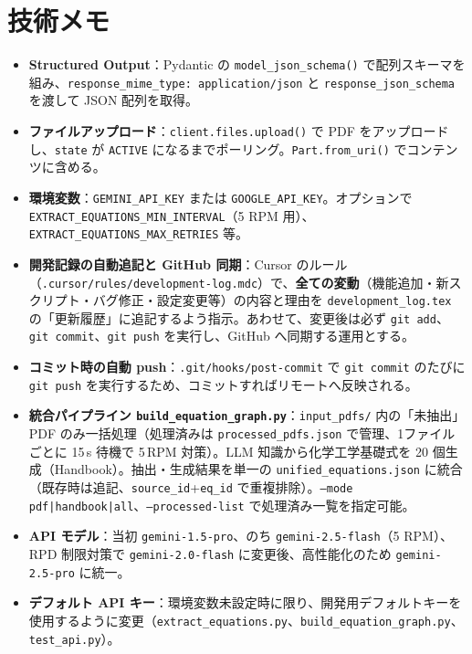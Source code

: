 \documentclass[11pt,a4paper]{jsarticle}
\begin{document}
\section{技術メモ}
\begin{itemize}[nosep]
  \item \textbf{Structured Output}：Pydantic の \texttt{model\_json\_schema()} で配列スキーマを組み、\texttt{response\_mime\_type: application/json} と \texttt{response\_json\_schema} を渡して JSON 配列を取得。
  \item \textbf{ファイルアップロード}：\texttt{client.files.upload()} で PDF をアップロードし、\texttt{state} が \texttt{ACTIVE} になるまでポーリング。\texttt{Part.from\_uri()} でコンテンツに含める。
  \item \textbf{環境変数}：\texttt{GEMINI\_API\_KEY} または \texttt{GOOGLE\_API\_KEY}。オプションで \texttt{EXTRACT\_EQUATIONS\_MIN\_INTERVAL}（5 RPM 用）、\texttt{EXTRACT\_EQUATIONS\_MAX\_RETRIES} 等。
  \item \textbf{開発記録の自動追記と GitHub 同期}：Cursor のルール（\texttt{.cursor/rules/development-log.mdc}）で、\textbf{全ての変動}（機能追加・新スクリプト・バグ修正・設定変更等）の内容と理由を \texttt{development\_log.tex} の「更新履歴」に追記するよう指示。あわせて、変更後は必ず \texttt{git add}、\texttt{git commit}、\texttt{git push} を実行し、GitHub へ同期する運用とする。
  \item \textbf{コミット時の自動 push}：\texttt{.git/hooks/post-commit} で \texttt{git commit} のたびに \texttt{git push} を実行するため、コミットすればリモートへ反映される。
  \item \textbf{統合パイプライン \texttt{build\_equation\_graph.py}}：\texttt{input\_pdfs/} 内の「未抽出」PDF のみ一括処理（処理済みは \texttt{processed\_pdfs.json} で管理、1ファイルごとに 15\,s 待機で 5\,RPM 対策）。LLM 知識から化学工学基礎式を 20 個生成（Handbook）。抽出・生成結果を単一の \texttt{unified\_equations.json} に統合（既存時は追記、\texttt{source\_id}+\texttt{eq\_id} で重複排除）。\texttt{--mode pdf|handbook|all}、\texttt{--processed-list} で処理済み一覧を指定可能。
  \item \textbf{API モデル}：当初 \texttt{gemini-1.5-pro}、のち \texttt{gemini-2.5-flash}（5 RPM）、RPD 制限対策で \texttt{gemini-2.0-flash} に変更後、高性能化のため \texttt{gemini-2.5-pro} に統一。
  \item \textbf{デフォルト API キー}：環境変数未設定時に限り、開発用デフォルトキーを使用するように変更（\texttt{extract\_equations.py}、\texttt{build\_equation\_graph.py}、\texttt{test\_api.py}）。

\end{itemize}
\end{document}
